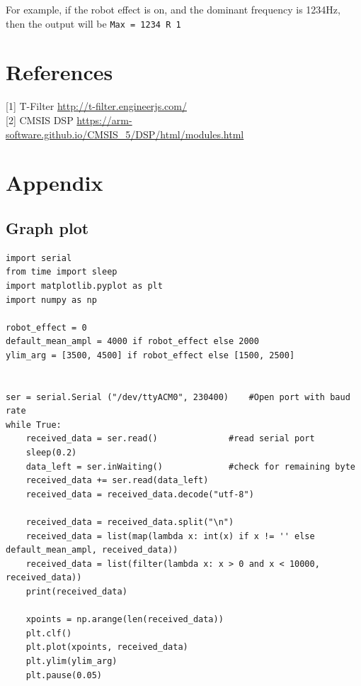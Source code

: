 \documentclass[11pt]{article}
\begin{document}
For example, if the robot effect is on, and the dominant frequency is 1234Hz, then the output will be \texttt{Max = 1234   R 1}

\section{References}
\label{sec:orgac7f7ae}
[1] T-Filter \url{http://t-filter.engineerjs.com/} \\[0pt]

[2] CMSIS DSP \url{https://arm-software.github.io/CMSIS\_5/DSP/html/modules.html}
\section{Appendix}
\label{sec:orga3cf751}
\subsection{Graph plot}
\label{sec:orgc6b3762}

\begin{verbatim}
import serial
from time import sleep
import matplotlib.pyplot as plt
import numpy as np

robot_effect = 0
default_mean_ampl = 4000 if robot_effect else 2000
ylim_arg = [3500, 4500] if robot_effect else [1500, 2500]


ser = serial.Serial ("/dev/ttyACM0", 230400)    #Open port with baud rate
while True:
    received_data = ser.read()              #read serial port
    sleep(0.2)
    data_left = ser.inWaiting()             #check for remaining byte
    received_data += ser.read(data_left)
    received_data = received_data.decode("utf-8")

    received_data = received_data.split("\n")
    received_data = list(map(lambda x: int(x) if x != '' else default_mean_ampl, received_data))
    received_data = list(filter(lambda x: x > 0 and x < 10000, received_data))
    print(received_data)

    xpoints = np.arange(len(received_data))
    plt.clf()
    plt.plot(xpoints, received_data)
    plt.ylim(ylim_arg)
    plt.pause(0.05)
\end{verbatim}
\end{document}
